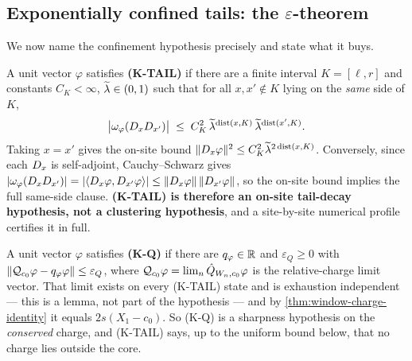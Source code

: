 \subsection{Exponentially confined tails: the \texorpdfstring{$\varepsilon$}{epsilon}-theorem}
\label{subsec:eps-theorem}

We now name the confinement hypothesis precisely and state what it buys.

\begin{definition}
\label{def:k-tail}
A unit vector $\varphi$ satisfies \textbf{(K-TAIL)} if there are a finite
interval $K=[\ell,r]$ and constants $C_K<\infty$, $\widetilde{\lambda}\in(0,1)$ such that for
all $x,x'\notin K$ lying on the \emph{same} side of $K$,
\begin{equation}
  \bigl|\omega_\varphi(D_x D_{x'})\bigr|
  \;\le\; C_K^2\,\widetilde{\lambda}^{\operatorname{dist}(x,K)}\,\widetilde{\lambda}^{\operatorname{dist}(x',K)} .
  \label{eq:k-tail}
\end{equation}
Taking $x=x'$ gives the on-site bound
$\lVert D_x\varphi\rVert^2\le C_K^2\widetilde{\lambda}^{2\operatorname{dist}(x,K)}$. Conversely, since each
$D_x$ is self-adjoint, Cauchy--Schwarz gives
$\lvert \omega_\varphi(D_xD_{x'})\rvert
=\lvert \langle D_x\varphi,D_{x'}\varphi\rangle\rvert
\le\lVert D_x\varphi\rVert\,\lVert D_{x'}\varphi\rVert$, so the on-site bound implies
the full same-side clause. \textbf{(K-TAIL) is therefore an on-site tail-decay
hypothesis, not a clustering hypothesis}, and a site-by-site numerical profile
certifies it in full.
\end{definition}

\begin{definition}
\label{def:k-q}
A unit vector $\varphi$ satisfies \textbf{(K-Q)} if there are $q_\varphi\in\mathbb{R}$
and $\varepsilon_Q\ge0$ with
$\lVert \mathcal{Q}_{c_0}\varphi-q_\varphi\varphi\rVert\le\varepsilon_Q$, where
$\mathcal{Q}_{c_0}\varphi=\lim_n\hat{Q}_{W_n,c_0}\varphi$ is the relative-charge limit
vector. That limit exists on every (K-TAIL) state and is exhaustion
independent --- this is a lemma, not part of the hypothesis --- and by
\cref{thm:window-charge-identity} it equals $2s(X_1-c_0)$. So (K-Q) is a
sharpness hypothesis on the \emph{conserved} charge, and (K-TAIL) says, up to
the uniform bound below, that no charge lies outside the core.
\end{definition}

